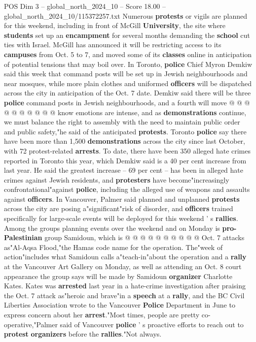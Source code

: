 \begin{textsample}{POS Dim 3 – global\_north\_2024\_10 – Score 18.00 – global\_north\_2024\_10/115372257.txt}
Numerous \textbf{protests} or vigils are planned for this weekend, including in front of McGill \textbf{University}, the site where \textbf{students} set up an \textbf{encampment} for several months demanding the \textbf{school} cut ties with Israel.
McGill has announced it will be restricting access to its \textbf{campuses} from Oct. 5 to 7, and moved some of its \textbf{classes} online in anticipation of potential tensions that may boil over.
In Toronto, \textbf{police} Chief Myron Demkiw said this week that command posts will be set up in Jewish neighbourhoods and near mosques, while more plain clothes and uniformed \textbf{officers} will be dispatched across the city in anticipation of the Oct. 7 date.
Demkiw said there will be three \textbf{police} command posts in Jewish neighbourhoods, and a fourth will move @ @ @ @ @ @ @ @ @ @ know emotions are intense, and as \textbf{demonstrations} continue, we must balance the right to assembly with the need to maintain public order and public safety,"he said of the anticipated \textbf{protests}.
Toronto \textbf{police} say there have been more than 1,500 \textbf{demonstrations} across the city since last October, with 72 protest-related \textbf{arrests}.
To date, there have been 350 alleged hate crimes reported in Toronto this year, which Demkiw said is a 40 per cent increase from last year.
He said the greatest increase -- 69 per cent -- has been in alleged hate crimes against Jewish residents, and \textbf{protesters} have become"increasingly confrontational"against \textbf{police}, including the alleged use of weapons and assaults against \textbf{officers}.
In Vancouver, Palmer said planned and unplanned \textbf{protests} across the city are posing a"significant"risk of disorder, and \textbf{officers} trained specifically for large-scale events will be deployed for this weekend ' s \textbf{rallies}.
Among the groups planning events over the weekend and on Monday is \textbf{pro-Palestinian} group Samidoun, which is @ @ @ @ @ @ @ @ @ @ Oct. 7 attacks as"Al-Aqsa Flood,"the Hamas code name for the operation.
The"week of action"includes what Samidoun calls a"teach-in"about the operation and a \textbf{rally} at the Vancouver Art Gallery on Monday, as well as attending an Oct. 8 court appearance the group says will be made by Samidoun \textbf{organizer} Charlotte Kates.
Kates was \textbf{arrested} last year in a hate-crime investigation after praising the Oct. 7 attack as"heroic and brave"in a \textbf{speech} at a \textbf{rally}, and the BC Civil Liberties Association wrote to the Vancouver \textbf{Police} Department in June to express concern about her \textbf{arrest}."Most times, people are pretty co-operative,"Palmer said of Vancouver \textbf{police} ' s proactive efforts to reach out to \textbf{protest} \textbf{organizers} before the \textbf{rallies}."Not always.

\end{textsample}
